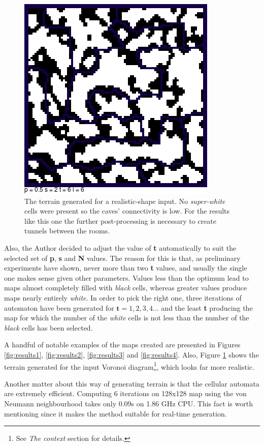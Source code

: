 \documentclass[a4paper, 11pt]{article} %
\begin{document}
\begin{figure}
	\centering
	\includegraphics[scale=0.5]{voronoi}
	\caption{The terrain generated for a realistic-shape input. No \emph{super-white} cells were present so the caves' connectivity is low. For the results like this one the further post-processing is necessary to create tunnels between the rooms.}
	\label{fig:voronoi}
\end{figure}

Also, the Author decided to adjust the value of \textbf{t} automatically to suit the selected set of \textbf{p}, \textbf{s} and \textbf{N} values. The reason for this is that, as preliminary experiments have shown, never more than two \textbf{t} values, and usually the single one makes sense given other parameters. Values less than the optimum lead to maps almost completely filled with \emph{black} cells, whereas greater values produce maps nearly entirely \emph{white}. In order to pick the right one, three iterations of automaton have been generated for $\textbf{t} = 1,2,3,4...$ and the least \textbf{t} producing the map for which the number of the \emph{white} cells is not less than the number of the \emph{black} cells has been selected.

A handful of notable examples of the maps created are presented in Figures \ref{fig:results1}, \ref{fig:results2}, \ref{fig:results3} and \ref{fig:results4}. Also, Figure \ref{fig:voronoi} shows the terrain generated for the input Voronoi diagram\footnote{See \emph{The context} section for details.}, which looks far more realistic.

Another matter about this way of generating terrain is that the cellular automata are extremely efficient. Computing 6 iterations on 128x128 map using the von Neumann neighbourhood takes only 0.09s on 1.86 GHz CPU. This fact is worth mentioning since it makes the method suitable for real-time generation. 
\end{document}
